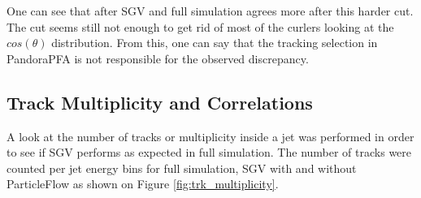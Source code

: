
\noindent
One can see that after SGV and full simulation agrees more after this harder cut. The cut seems still not enough to get rid of most of the curlers looking at the $cos(\theta)$ distribution. From this, one can say that the tracking selection in PandoraPFA is not responsible for the observed discrepancy.

\subsection{Track Multiplicity and Correlations}

A look at the number of tracks or multiplicity inside a jet was performed in order to see if SGV performs as expected in full simulation. The number of tracks were counted per jet energy bins for full simulation, SGV with and without ParticleFlow as shown on Figure \ref{fig:trk_multiplicity}.

